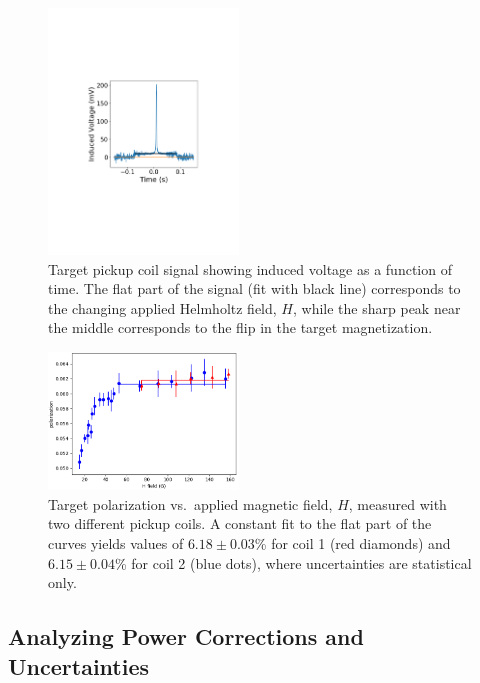 \begin{figure}[ht]
 \begin{center}
  \includegraphics[width=0.45\textwidth]{11Vtgtdata.pdf}
 \end{center}
 \caption{Target pickup coil signal showing induced voltage as a function of time.  The flat part of the signal (fit with black line) corresponds 
 	to the changing applied Helmholtz field, $H$, while the sharp peak near the middle corresponds to the flip in the target magnetization.}
 \label{fig-TPolMeas}
\end{figure}

\begin{figure}[ht]
 \begin{center}
  \includegraphics[width=0.45\textwidth]{PvsH0.png}
 \end{center}
	\caption{Target polarization vs.~applied magnetic field, $H$, measured with two different pickup coils. A constant fit to the flat part 
	of the curves yields values of $6.18\pm 0.03$\% for coil 1 (red diamonds) and $6.15\pm 0.04$\% for coil 2 (blue dots), where 
	uncertainties are statistical only.} 
 \label{fig-PSat}
\end{figure}

\subsection{Analyzing Power Corrections and Uncertainties}
\label{sec-PolCor}

